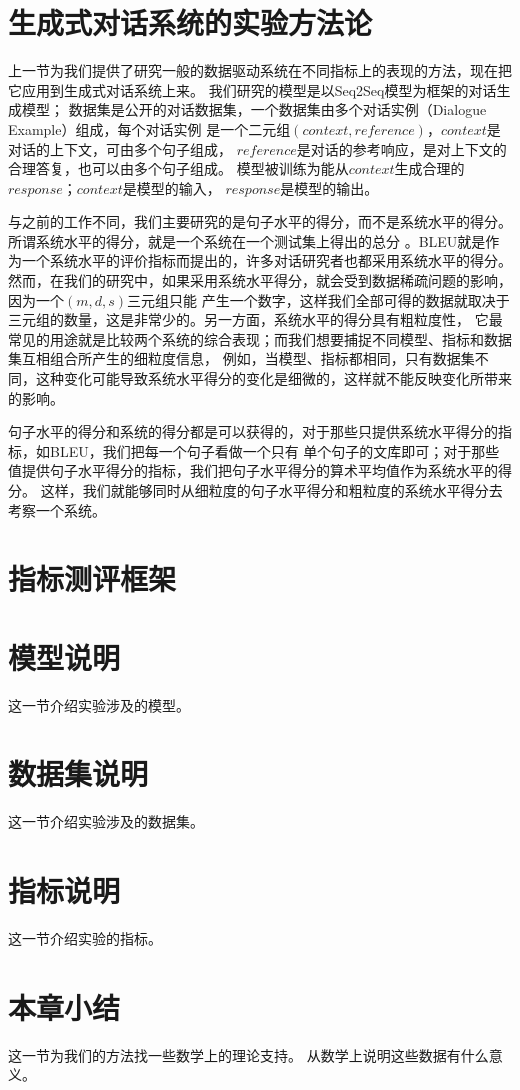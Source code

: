 \section{生成式对话系统的实验方法论}
上一节为我们提供了研究一般的数据驱动系统在不同指标上的表现的方法，现在把它应用到生成式对话系统上来。
我们研究的模型是以Seq2Seq模型为框架的对话生成模型；
数据集是公开的对话数据集，一个数据集由多个对话实例（Dialogue Example）组成，每个对话实例
是一个二元组$(context, reference)$，$context$是对话的上下文，可由多个句子组成，
$reference$是对话的参考响应，是对上下文的合理答复，也可以由多个句子组成。
模型被训练为能从$context$生成合理的$response$；$context$是模型的输入， $response$是模型的输出。


与之前的工作不同，我们主要研究的是句子水平的得分，而不是系统水平的得分。
所谓系统水平的得分，就是一个系统在一个测试集上得出的总分
。BLEU就是作为一个系统水平的评价指标而提出的，许多对话研究者也都采用系统水平的得分。
然而，在我们的研究中，如果采用系统水平得分，就会受到数据稀疏问题的影响，因为一个$(m,d,s)$三元组只能
产生一个数字，这样我们全部可得的数据就取决于三元组的数量，这是非常少的。另一方面，系统水平的得分具有粗粒度性，
它最常见的用途就是比较两个系统的综合表现；而我们想要捕捉不同模型、指标和数据集互相组合所产生的细粒度信息，
例如，当模型、指标都相同，只有数据集不同，这种变化可能导致系统水平得分的变化是细微的，这样就不能反映变化所带来的影响。

句子水平的得分和系统的得分都是可以获得的，对于那些只提供系统水平得分的指标，如BLEU，我们把每一个句子看做一个只有
单个句子的文库即可；对于那些值提供句子水平得分的指标，我们把句子水平得分的算术平均值作为系统水平的得分。
这样，我们就能够同时从细粒度的句子水平得分和粗粒度的系统水平得分去考察一个系统。

\section{指标测评框架}\label{sec:指标测评框架}

\section{模型说明}\label{sec:模型说明}
这一节介绍实验涉及的模型。

\section{数据集说明}\label{sec:数据集说明}
这一节介绍实验涉及的数据集。

\section{指标说明}\label{sec:指标说明}
这一节介绍实验的指标。

\section{本章小结}\label{sec:本章小结2}
这一节为我们的方法找一些数学上的理论支持。
从数学上说明这些数据有什么意义。
